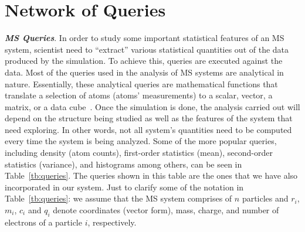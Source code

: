 \documentclass[10pt,journal,final,letterpaper,twocolumn]{IEEEtran}
\begin{document}

\section{Network of Queries}\label{sc:querynetwork}

\textbf{\emph{MS Queries}}. In order to study some important
statistical features of an MS system, scientist need to ``extract''
various statistical quantities out of the data produced by the
simulation. To achieve this, queries are executed against the data.
Most of the queries used in the analysis of MS systems are
analytical in nature. Essentially, these analytical queries are
mathematical functions that translate a selection of atoms (atoms'
measurements) to a scalar, vector, a matrix, or a data
cube~\cite{SimDB}. Once the simulation is done, the analysis carried
out will depend on the structure being studied as well as the
features of the system that need exploring. In other words, not all
system's quantities need to be computed every time the system is
being analyzed. Some of the more popular queries, including density
(atom counts), first-order statistics (mean), second-order
statistics (variance), and histograms among others, can be seen in
Table~\ref{tb:queries}. The queries shown in this table are the ones
that we have also incorporated in our system. Just to clarify some
of the notation in Table~\ref{tb:queries}: we assume that the MS
system comprises of $n$ particles and $r_i$, $m_i$, $c_i$ and $q_i$
denote coordinates (vector form), mass, charge, and number of
electrons of a particle $i$, respectively.
\end{document}

